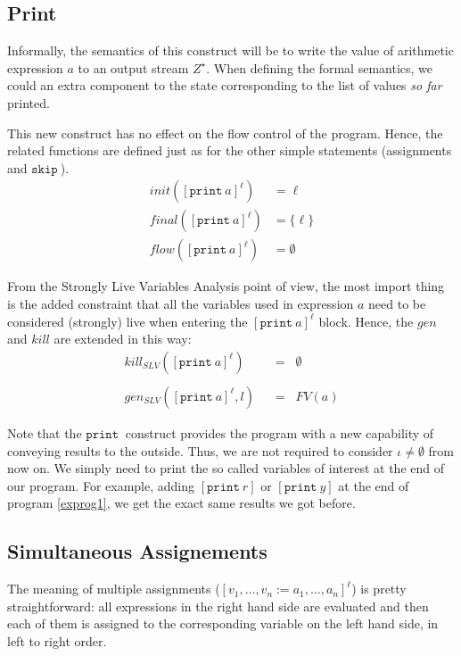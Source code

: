 \documentclass[a4wide,12pt]{article}
\def\eq{\;\; = \;\;}
\def\skip {\texttt{skip}\ }
\def\print{\texttt{print}\ }
\def\program#1{\fbox{\begin{minipage}{0.5\textwidth}\protect{$\begin{array}{ll} #1 \end{array}$}\end{minipage}}}
\begin{document}
\subsection{Print}
 
Informally, the semantics of this construct will be to write the value of arithmetic expression $a$ to an output
stream $Z^\star$. When defining the formal semantics, we could an extra component to the state corresponding to the
list of values \emph{so far} printed.
 
This new construct has no effect on the flow control of the program. Hence, the related functions are
defined just as for the other simple statements (assignments and $\skip$).
\begin{align*}
init([\print a]^\ell) & = \ell \\
final([\print a]^\ell) & = \{\ell\} \\
flow([\print a]^\ell) & = \emptyset
\end{align*}
 
From the Strongly Live Variables Analysis point of view, the most import thing is
the added constraint that all the variables used in expression $a$ need to be
considered (strongly) live when entering the $[\print a]^\ell$ block. Hence, the $gen$ and $kill$ are extended in this way:
\begin{align*}
kill_{SLV}([\print a]^\ell) & \eq \emptyset \\
\\
gen_{SLV}([\print a]^\ell,l) & \eq FV(a)
\end{align*}
 
Note that the $\print$ construct provides the program with a new capability of conveying
results to the outside. Thus, we are not required to consider $\iota \neq \emptyset$ from now on.
We simply need to print the so called variables of interest at the end of our program.
For example, adding $[\print r]$ or $[\print y]$ at the end of program \ref{exprog1},
we get the exact same results we got before.
 
\program{}
 
\subsection{Simultaneous Assignements}
 
The meaning of multiple assignments ($[v_1,\ldots,v_n := a_1,\ldots,a_n]^\ell$) is
pretty straightforward: all expressions in the right hand side are evaluated and
then each of them is assigned to the corresponding variable on the left hand side, in left to right order.
 
\end{document}
